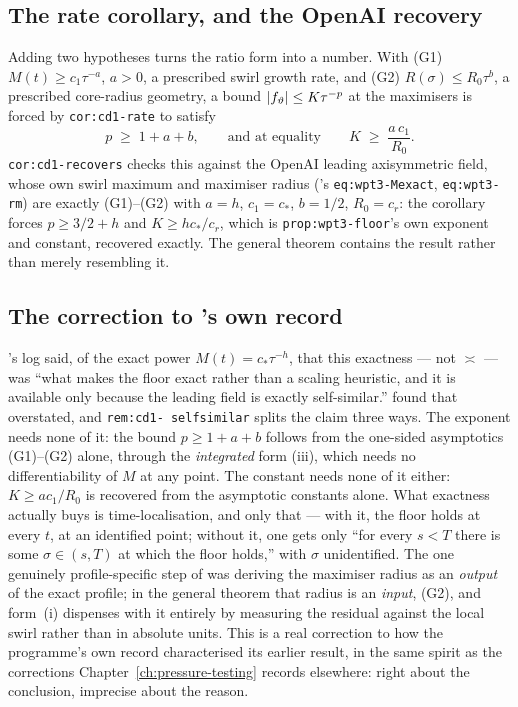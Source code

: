 \subsection{The rate corollary, and the OpenAI recovery}
\label{sec:ff-s60-rate}

Adding two hypotheses turns the ratio form into a number. With (G1)
\(M(t)\ge c_1\tau^{-a}\), \(a>0\), a prescribed swirl growth rate, and (G2)
\(R(\sigma)\le R_0\tau^b\), a prescribed core-radius geometry, a bound
\(\left|f_\vartheta\right|\le K\tau^{-p}\) at the maximisers is forced by
\texttt{cor:cd1-rate} to satisfy
\[
p\;\ge\;1+a+b, \qquad\text{and at equality}\qquad K\;\ge\;\frac{a\,c_1}{R_0}.
\]
\texttt{cor:cd1-recovers} checks this against the OpenAI leading axisymmetric
field, whose own swirl maximum and maximiser radius ('s
\texttt{eq:wpt3-Mexact}, \texttt{eq:wpt3-rm}) are exactly (G1)--(G2) with
\(a=h\), \(c_1=c_*\), \(b=1/2\), \(R_0=c_r\): the corollary forces
\(p\ge3/2+h\) and \(K\ge hc_*/c_r\), which is \texttt{prop:wpt3-floor}'s own
exponent and constant, recovered exactly. The general theorem contains the
 result rather than merely resembling it.

\subsection{The correction to \texorpdfstring{}{S55}'s own record}
\label{sec:ff-s60-correction}

's log said, of the exact power \(M(t)=c_*\tau^{-h}\), that this
exactness --- not \(\asymp\) --- was ``what makes the floor exact rather than
a scaling heuristic, and it is available only because the leading field is
exactly self-similar.''  found that overstated, and \texttt{rem:cd1-%
selfsimilar} splits the claim three ways. The exponent needs none of it: the
bound \(p\ge1+a+b\) follows from the one-sided asymptotics (G1)--(G2) alone,
through the \emph{integrated} form (iii), which needs no differentiability of
\(M\) at any point. The constant needs none of it either: \(K\ge ac_1/R_0\) is
recovered from the asymptotic constants alone. What exactness actually buys
is time-localisation, and only that --- with it, the floor holds at every
\(t\), at an identified point; without it, one gets only ``for every \(s<T\)
there is some \(\sigma\in(s,T)\) at which the floor holds,'' with \(\sigma\)
unidentified. The one genuinely profile-specific step of  was deriving
the maximiser radius as an \emph{output} of the exact profile; in the general
theorem that radius is an \emph{input}, (G2), and form~(i) dispenses with it
entirely by measuring the residual against the local swirl rather than in
absolute units. This is a real correction to how the programme's own record
characterised its earlier result, in the same spirit as the corrections
Chapter~\ref{ch:pressure-testing} records elsewhere: right about the
conclusion, imprecise about the reason.

